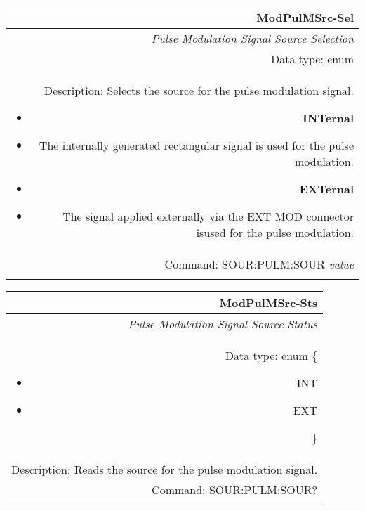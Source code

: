 \documentclass[openany]{article}
\begin{document}
		\begin{tabular}{N}
			\hline
			\bfseries ModPulMSrc-Sel \\ \hline
			\emph{Pulse Modulation Signal Source Selection} \\
			Data type: enum \\  
			Description: Selects the source for the pulse modulation signal.\begin{itemize}[noitemsep]
				\small
				\item[] \textbf{INTernal}
                                \item[] The internally generated rectangular signal is used for the pulse modulation.
                                \item[] \textbf{EXTernal}
                                \item[] The signal applied externally via the EXT MOD connector isused for the pulse modulation.
			\end{itemize} \\
			Command: SOUR:PULM:SOUR \emph{value} \\
			\\

		\end{tabular}


		\begin{tabular}{N}
			\hline
			\bfseries ModPulMSrc-Sts \\ \hline
			\emph{Pulse Modulation Signal Source Status} \\
			Data type: enum \{\begin{itemize}[noitemsep]
				\small
				\item[] INT
				\item[] EXT
			\end{itemize}\} \\ 
			Description: Reads the source for the pulse modulation signal. \\
			Command: SOUR:PULM:SOUR? \\
			\\

		\end{tabular}
\end{document}
